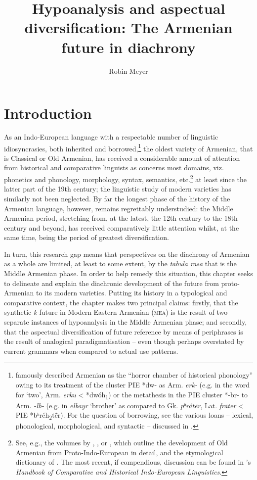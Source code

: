 \documentclass[output=paper,colorlinks,citecolor=brown]{langscibook}
\author{Robin Meyer\orcid{0000-0002-1177-0639}\affiliation{Université de Lausanne}}
\title[Hypoanalysis and aspectual diversification]{Hypoanalysis and aspectual diversification: The Armenian future in diachrony}
\begin{document}
	\maketitle

	\newpage
	
	\section{Introduction}\label{sec:meyer:intro}
	As an Indo-European language with a respectable number of linguistic idiosyncrasies, both inherited and borrowed,\footnote{\citet[iv]{Olsen1999} famously described Armenian as the ``horror chamber of historical phonology'' owing to its treatment of the cluster PIE *dw- as Arm. \textit{erk-} (e.g. in the word for ‘two’, Arm. \textit{erku} < *dwóh\textsubscript{1}) or the metathesis in the PIE cluster *-br- to Arm. \textit{-łb-} (e.g. in \textit{ełbayr} ‘brother’ as compared to Gk. \textit{pʰrā́tēr}, Lat. \textit{frāter} < PIE *bʰréh\textsubscript{2}tḗr). For the question of borrowing, see the various loans – lexical, phonological, morphological, and syntactic – discussed in \citet{Meyer2023}.} the oldest variety of Armenian, that is Classical or Old Armenian, has received a considerable amount of attention from historical and comparative linguists as concerns most domains, viz. phonetics and phonology, morphology, syntax, semantics, etc.\footnote{See, e.g., the volumes by \citet{Meillet1936}, \citet{Godel1975}, \citet{Klingenschmitt1982} or \citet{Schmitt2007}, which outline the development of Old Armenian from Proto-Indo-European in detail, and the etymological dictionary of \citet{Martirosyan2010}. The most recent, if compendious, discussion can be found in \citet[1028–1165]{KleinJosephFritz2017}'s \textit{Handbook of Comparative and Historical Indo-European Linguistics}.} at least since the latter part of the 19th century; the linguistic study of modern varieties has similarly not been neglected. By far the longest phase of the history of the Armenian language, however, remains regrettably understudied: the Middle Armenian period, stretching from, at the latest, the 12th century to the 18th century and beyond, has received comparatively little attention whilst, at the same time, being the period of greatest diversification.
	
	In turn, this research gap means that perspectives on the diachrony of Armenian as a whole are limited, at least to some extent, by the \textit{tabula rasa} that is the Middle Armenian phase. In order to help remedy this situation, this chapter seeks to delineate and explain the diachronic development of the future from proto-Armenian to its modern varieties. Putting its history in a typological and comparative context, the chapter makes two principal claims: firstly, that the synthetic \textit{k-}future in Modern Eastern Armenian (\textsc{mea}) is the result of two separate instances of hypoanalysis in the Middle Armenian phase; and secondly, that the aspectual diversification of future reference by means of periphrases is the result of analogical paradigmatisation – even though perhaps overstated by current grammars when compared to actual use patterns.
	
\end{document}

